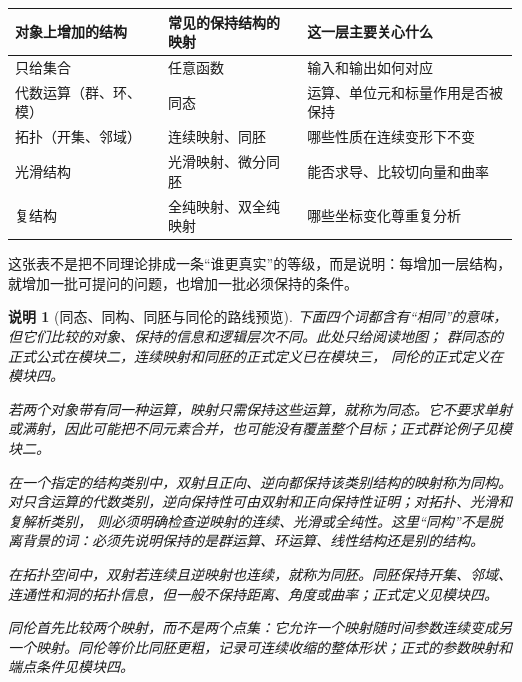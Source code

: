 \documentclass[UTF8,fontset=none,a4paper,11pt]{ctexart}
\theoremstyle{foundation-definition}
\theoremstyle{foundation-theorem}
\theoremstyle{foundation-proposition}
\theoremstyle{foundation-example}
\theoremstyle{foundation-remark}
\newtheorem{remark}[definition]{说明}
\theoremstyle{foundation-theorem}
\begin{document}
\begin{center}
{\small
\begin{tabularx}{\textwidth}{p{}p{}X}
\toprule
对象上增加的结构 & 常见的保持结构的映射 & 这一层主要关心什么 \\
\midrule
只给集合 & 任意函数 & 输入和输出如何对应 \\
代数运算（群、环、模） & 同态 & 运算、单位元和标量作用是否被保持 \\
拓扑（开集、邻域） & 连续映射、同胚 & 哪些性质在连续变形下不变 \\
光滑结构 & 光滑映射、微分同胚 & 能否求导、比较切向量和曲率 \\
复结构 & 全纯映射、双全纯映射 & 哪些坐标变化尊重复分析 \\
\bottomrule
\end{tabularx}
}
\end{center}

这张表不是把不同理论排成一条“谁更真实”的等级，而是说明：每增加一层结构，就增加一批可提问的问题，也增加一批必须保持的条件。

\begin{remark}[同态、同构、同胚与同伦的路线预览]\label{rem:basic-equivalences}
下面四个词都含有“相同”的意味，但它们比较的对象、保持的信息和逻辑层次不同。此处只给阅读地图；
群同态的正式公式在模块二，连续映射和同胚的正式定义已在模块三， 同伦的正式定义在模块四。

\begin{description}[leftmargin=3.2cm,style=nextline]
  \item[同态（homomorphism）]
  若两个对象带有同一种运算，映射只需保持这些运算，就称为同态。它不要求单射或满射，因此可能把不同元素合并，也可能没有覆盖整个目标；正式群论例子见模块二。

  \item[同构（isomorphism）]
  在一个指定的结构类别中，双射且正向、逆向都保持该类别结构的映射称为同构。
  对只含运算的代数类别，逆向保持性可由双射和正向保持性证明；对拓扑、光滑和复解析类别，
  则必须明确检查逆映射的连续、光滑或全纯性。这里“同构”不是脱离背景的词：必须先说明保持的是群运算、环运算、线性结构还是别的结构。

  \item[同胚（homeomorphism）]
  在拓扑空间中，双射若连续且逆映射也连续，就称为同胚。同胚保持开集、邻域、连通性和洞的拓扑信息，但一般不保持距离、角度或曲率；正式定义见模块四。

  \item[同伦（homotopy）]
  同伦首先比较两个映射，而不是两个点集：它允许一个映射随时间参数连续变成另一个映射。同伦等价比同胚更粗，记录可连续收缩的整体形状；正式的参数映射和端点条件见模块四。
\end{description}
\end{remark}
\end{document}
